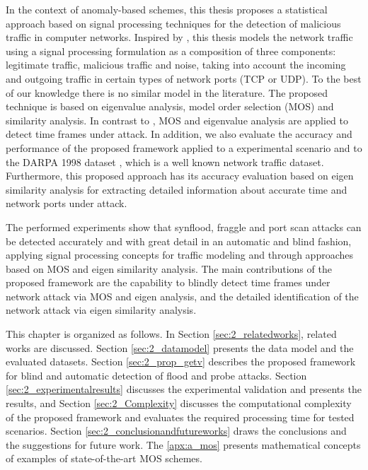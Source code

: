In the context of anomaly-based schemes, this thesis proposes a statistical approach based on signal processing techniques for the detection of malicious traffic in computer networks. Inspired by \cite{david2011blind,da2012improved}, this thesis models the network traffic using a signal processing formulation as a composition of three components: legitimate traffic, malicious traffic and noise, taking into account the incoming and outgoing traffic in certain types of network ports (TCP or UDP). To the best of our knowledge there is no similar model in the literature. The proposed technique is based on eigenvalue analysis, model order selection (MOS) and similarity analysis. In contrast to \cite{david2011blind,da2012improved,tenorio2013greatest}, MOS and eigenvalue analysis are applied to detect time frames under attack. In addition, we also evaluate the accuracy and performance of the proposed framework applied to a experimental scenario and to the DARPA 1998 dataset \citep{osanaiye2016distributed}, which is a well known network traffic dataset. Furthermore, this proposed approach has its accuracy evaluation based on eigen similarity analysis for extracting detailed information about accurate time and network ports under attack. 

The performed experiments show that synflood, fraggle and port scan attacks can be detected accurately and with great detail in an automatic and blind fashion, applying signal processing concepts for traffic modeling and through approaches based on MOS and eigen similarity analysis. The main contributions of the proposed framework are the capability to blindly detect time frames under network attack via MOS and eigen analysis, and the detailed identification of the network attack via eigen similarity analysis.

This chapter is organized as follows. In Section \ref{sec:2_relatedworks}, related works are discussed. Section \ref{sec:2_datamodel} presents the data model and the evaluated datasets. Section \ref{sec:2_prop_getv} describes the proposed framework for blind and automatic detection of flood and probe attacks. Section \ref{sec:2_experimentalresults} discusses the experimental validation and presents the results, and Section \ref{sec:2_Complexity} discusses the computational complexity of the proposed framework and evaluates the required processing time for tested scenarios. Section \ref{sec:2_conclusionandfutureworks} draws the conclusions and the suggestions for future work. The \ref{apx:a_mos} presents mathematical concepts of examples of state-of-the-art MOS schemes.


